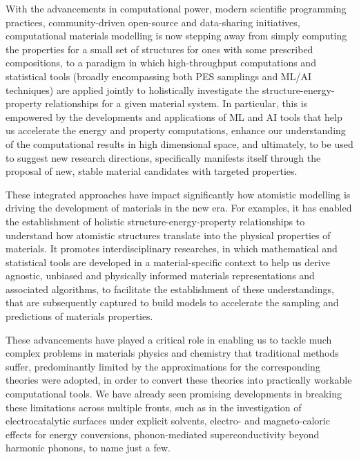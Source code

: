 With the advancements in computational power, modern scientific programming practices, community-driven open-source and data-sharing initiatives, computational materials modelling is now stepping away from simply computing the properties for a small set of structures for ones with some prescribed compositions, to a paradigm in which high-throughput computations and statistical tools (broadly encompassing both PES samplings and ML/AI techniques) are applied jointly to holistically investigate the structure-energy-property relationships for a given material system. In particular, this is empowered by the developments and applications of ML and AI tools that help us accelerate the energy and property computations, enhance our understanding of the computational results in high dimensional space, and ultimately, to be used to suggest new research directions, specifically manifests itself through the proposal of new, stable material candidates with targeted properties.

These integrated approaches have impact significantly how atomistic modelling is driving the development of materials in the new era. For examples, it has enabled the establishment of holistic structure-energy-property relationships to understand how atomistic structures translate into the physical properties of materials. It promotes interdisciplinary researches, in which mathematical and statistical tools are developed in a material-specific context to help us derive agnostic, unbiased and physically informed materials representations and associated algorithms, to facilitate the establishment of these understandings, that are subsequently captured to build models to accelerate the sampling and predictions of materials properties. 

These advancements have played a critical role in enabling us to tackle much complex problems in materials physics and chemistry that traditional methods suffer, predominantly limited by the approximations for the corresponding theories were adopted, in order to convert these theories into practically workable computational tools. We have already seen promising developments in breaking these limitations across multiple fronts, such as in the investigation of electrocatalytic surfaces under explicit solvents,\cite{Qin2023CO2Electroreduction,Sakong2018ElectricDoubleLayer,Andrade2020ProtonTransfer} electro- and magneto-caloric effects for energy conversions,\cite{graf2021unified} phonon-mediated superconductivity beyond harmonic phonons,\cite{zappacosta2025nonlinear} to name just a few.

